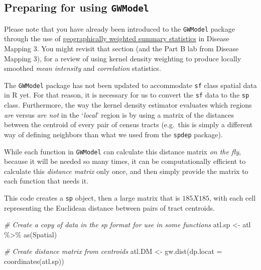 \documentclass[
]{book}
\newenvironment{Shaded}{\begin{snugshade}}{\end{snugshade}}
\newcommand{\AttributeTok}[1]{\textcolor[rgb]{0.77,0.63,0.00}{#1}}
\newcommand{\CommentTok}[1]{\textcolor[rgb]{0.56,0.35,0.01}{\textit{#1}}}
\newcommand{\FunctionTok}[1]{\textcolor[rgb]{0.00,0.00,0.00}{#1}}
\newcommand{\NormalTok}[1]{#1}
\newcommand{\OtherTok}[1]{\textcolor[rgb]{0.56,0.35,0.01}{#1}}
\newcommand{\SpecialCharTok}[1]{\textcolor[rgb]{0.00,0.00,0.00}{#1}}
\newcommand{\StringTok}[1]{\textcolor[rgb]{0.31,0.60,0.02}{#1}}
\newenvironment{rmdtip}[1]
  {
  \begin{itemize}
  \renewcommand{\labelitemi}{
    \raisebox{-.7\height}[0pt][0pt]{
      {\setkeys{Gin}{width=3em,keepaspectratio}\texttt{[image: images/\#1]}}
    }
  }
  \setlength{\fboxsep}{1em}
  \begin{tip}
  \item
  }
  {
  \end{tip}
  \end{itemize}
  }
\begin{document}
\hypertarget{preparing-for-using-gwmodel}{%
\subsection{\texorpdfstring{Preparing for using \texttt{GWModel}}{Preparing for using GWModel}}\label{preparing-for-using-gwmodel}}

\begin{rmdtip}{tip}
Please note that you have already been introduced to the \texttt{GWModel} package through the use of \protect\hyperlink{gwss}{geographically weighted summary statistics} in Disease Mapping 3. You might revisit that section (and the Part B lab from Disease Mapping 3), for a review of using kernel density weighting to produce locally smoothed \emph{mean intensity} and \emph{correlation} statistics.

\end{rmdtip}

The \texttt{GWModel} package has not been updated to accommodate \texttt{sf} class spatial data in R yet. For that reason, it is necessary for us to convert the \texttt{sf} data to the \texttt{sp} class. Furthermore, the way the kernel density estimator evaluates which regions \emph{are} versus \emph{are not} in the `\emph{local}' region is by using a matrix of the distances between the centroid of every pair of census tracts (e.g.~this is simply a different way of defining neighbors than what we used from the \texttt{spdep} package).

While each function in \texttt{GWModel} can calculate this distance matrix \emph{on the fly}, because it will be needed so many times, it can be computationally efficient to calculate this \emph{distance matrix} only once, and then simply provide the matrix to each function that needs it.

This code creates a \texttt{sp} object, then a large matrix that is \(185 X 185\), with each cell representing the Euclidean distance between pairs of tract centroids.

\begin{Shaded}
\begin{Highlighting}[]
\CommentTok{\# Create a copy of data in the \textquotesingle{}sp\textquotesingle{} format for use in some functions}
\NormalTok{atl.sp }\OtherTok{\textless{}{-}}\NormalTok{ atl }\SpecialCharTok{\%\textgreater{}\%}
  \FunctionTok{as}\NormalTok{(}\StringTok{\textquotesingle{}Spatial\textquotesingle{}}\NormalTok{)}

\CommentTok{\# Create distance matrix from centroids}
\NormalTok{atl.DM }\OtherTok{\textless{}{-}} \FunctionTok{gw.dist}\NormalTok{(}\AttributeTok{dp.locat =} \FunctionTok{coordinates}\NormalTok{(atl.sp))}
\end{Highlighting}
\end{Shaded}
\end{document}
